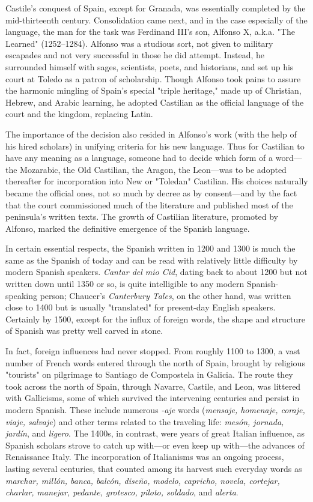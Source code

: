Castile's conquest of Spain, except for Granada, was essentially completed by the mid-thirteenth century. Consolidation came
next, and in the case especially of the language, the man for the task
was Ferdinand III's son, Alfonso X, a.k.a. "The Learned" (1252--1284).
Alfonso was a studious sort, not given to military escapades and not
very successful in those he did attempt. Instead, he surrounded himself
with sages, scientists, poets, and historians, and set up his court at Toledo as a patron of scholarship. Though Alfonso took pains to assure
the harmonic mingling of Spain's special "triple heritage," made up of
Christian, Hebrew, and Arabic learning, he adopted Castilian as the official language of the court and the kingdom, replacing Latin.

The importance of the decision also resided in Alfonso's work
(with the help of his hired scholars) in unifying criteria for his new language. Thus for Castilian to have any meaning as a language, someone
had to decide which form of a word---the Mozarabic, the Old Castilian,
the Aragon, the Leon---was to be adopted thereafter for incorporation
into New or "Toledan" Castilian. His choices naturally became the official ones, not so much by decree as by consent---and by the fact that
the court commissioned much of the literature and published most of
the peninsula's written texts. The growth of Castilian literature, promoted by Alfonso, marked the definitive emergence of the Spanish
language.

In certain essential respects, the Spanish written in 1200 and
1300 is much the same as the Spanish of today and can be read with
relatively little difficulty by modern Spanish speakers. \emph{Cantar del mio
Cid}, dating back to about 1200 but not written down until 1350 or so,
is quite intelligible to any modern Spanish-speaking person; Chaucer's
\emph{Canterbury Tales}, on the other hand, was written close to 1400 but
is usually "translated" for present-day English speakers. Certainly by
1500, except for the influx of foreign words, the shape and structure of
Spanish was pretty well carved in stone.

In fact, foreign influences had never stopped. From roughly
1100 to 1300, a vast number of French words entered through the
north of Spain, brought by religious "tourists" on pilgrimage to Santiago de Compostela in Galicia. The route they took across the north
of Spain, through Navarre, Castile, and Leon, was littered with Gallicisms, some of which survived the intervening centuries and persist in
modern Spanish. These include numerous \emph{-aje} words (\emph{mensaje, homenaje, coraje, viaje, salvaje}) and other terms related to the traveling life:
\emph{mesón, jornada, jardín}, and \emph{ligero}. The 1400s, in contrast, were years
of great Italian influence, as Spanish scholars strove to catch up with---or even keep up with---the advances of Renaissance Italy. The incorporation of Italianisms was an ongoing process, lasting several centuries,
that counted among its harvest such everyday words as \emph{marchar, millón, banca, balcón, diseño, modelo, capricho, novela, cortejar, charlar,
manejar, pedante, grotesco, piloto, soldado}, and \emph{alerta}.

